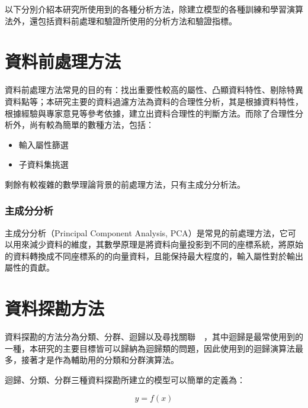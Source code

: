 以下分別介紹本研究所使用到的各種分析方法，除建立模型的各種訓練和學習演算法外，還包括資料前處理和驗證所使用的分析方法和驗證指標。


\section{資料前處理方法}

資料前處理方法常見的目的有：找出重要性較高的屬性、凸顯資料特性、剔除特異資料點等；本研究主要的資料過濾方法為資料的合理性分析，其是根據資料特性，根據經驗與專家意見等參考依據，建立出資料合理性的判斷方法。而除了合理性分析外，尚有較為簡單的數種方法，包括：

\begin{itemize}
\item 輸入屬性篩選
\item 子資料集挑選
\end{itemize}

剩餘有較複雜的數學理論背景的前處理方法，只有主成分分析法。

\subsubsection{主成分分析}

主成分分析（Principal Component Analysis, PCA）是常見的前處理方法，它可以用來減少資料的維度，其數學原理是將資料向量投影到不同的座標系統，將原始的資料轉換成不同座標系的的向量資料，且能保持最大程度的，輸入屬性對於輸出屬性的貢獻。


\section{資料探勘方法}

資料探勘的方法分為分類、分群、迴歸以及尋找關聯~\cite{fayyad1996data}~，其中迴歸是最常使用到的一種，本研究的主要目標皆可以歸納為迴歸類的問題，因此使用到的迴歸演算法最多，接著才是作為輔助用的分類和分群演算法。

迴歸、分類、分群三種資料探勘所建立的模型可以簡單的定義為：

\begin{equation} y = f(x) \label{eq:ModelEqu}\end{equation} 

